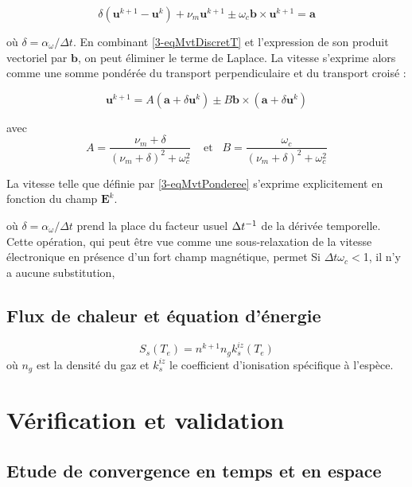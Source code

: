 \begin{refsection}
\begin{equation}
\label{3-eqMvtDiscretT}
\delta\left(\mathbf{u}^{k+1}-\mathbf{u}^{k}\right) + 
\nu_m\mathbf{u}^{k+1}\pm\omega_{c}\mathbf{b}\times\mathbf{u}^{k+1}=
\mathbf a
\end{equation}

où $\delta=\alpha_\omega/\Delta t$. En combinant \ref{3-eqMvtDiscretT} et
l'expression de son produit vectoriel par $\mathbf b$, on peut éliminer le
terme de Laplace. La vitesse s'exprime alors comme une somme pondérée du
transport perpendiculaire et du transport croisé :

\begin{equation}
\label{3-eqMvtPonderee}
\mathbf{u}^{k+1}=A\left(\mathbf a + \delta\mathbf{u}^{k}\right)\pm B\mathbf
b\times\left(\mathbf a + \delta\mathbf{u}^{k}\right)
\end{equation}

avec 
\begin{equation*}
\label{3-eqMvtPonderee}
A=\frac{\nu_m+\delta}{(\nu_m+\delta)^2+\omega_c^2}\;\;\;\;\text{et}\;\;\;B=\frac{\omega_c}{(\nu_m+\delta)^2+\omega_c^2}
\end{equation*}

La vitesse telle que définie par \eqref{3-eqMvtPonderee} s'exprime
explicitement en fonction du champ $\mathbf E^k$. 

où $\delta=\alpha_\omega/\Delta t$ prend la place du facteur
usuel $\Delta t^{{-1}}$ de la dérivée temporelle. Cette opération, qui
peut être vue comme une sous-relaxation de la vitesse électronique en présence
d'un fort champ magnétique, permet  Si $\Delta t\omega_c<$1, il n'y a aucune
substitution,


\subsection{Flux de chaleur et équation d'énergie}

\begin{equation}
S_s(T_e)=n^{k+1}n_gk_{s}^{iz}(T_e)
\end{equation}
où $n_g$ est la densité du gaz et $k_{s}^{iz}$ le coefficient d'ionisation spécifique à l'espèce.
\cite{Hemsworth}

\section{Vérification et validation}

\subsection{Etude de convergence en temps et en espace}

\end{refsection}

